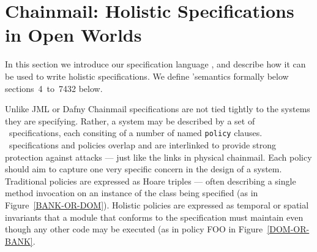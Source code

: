  


\section{Chainmail: Holistic Specifications in Open Worlds}



In this section we introduce our specification language \Chainmail,
and describe how it can be used to write holistic specifications.
We define \Chainmail'semantics formally below 
sections~4~to~7432 below.




  
Unlike JML or Dafny \cite{jml,daafny} Chainmail specifications are not
tied tightly to the systems they are specifying. Rather, a system may
be described by a set of \Chainmail\ specifications, each consiting of
a number of named \lstinline+policy+ clauses.
\Chainmail\ specifications and policies overlap and are interlinked to
provide strong protection against attacks --- just like the links in
physical chainmail.  Each policy should aim to capture one very
specific concern in the design of a system. Traditional policies are
expressed as Hoare triples --- often describing a single method
invocation on an instance of the class being specified (as in
Figure~\ref{BANK-OR-DOM}).  Holistic policies are expressed as 
temporal or spatial invariants that a module that
conforms to the specification must maintain even though any other code
may be executed (as in policy FOO in Figure~\ref{DOM-OR-BANK}.

